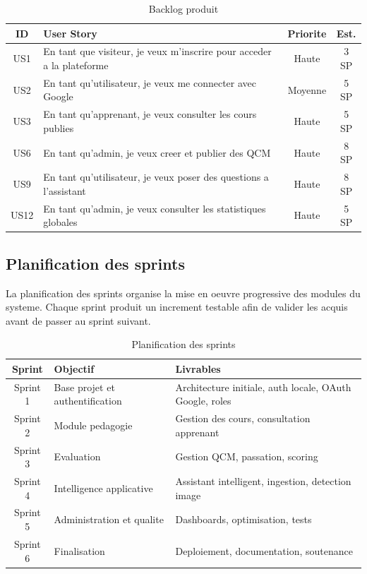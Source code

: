 \documentclass[a4paper,12pt]{report}
\begin{document}
\begin{table}[H]
  \centering
  \caption{Backlog produit}
  \label{tab:backlog}
  \begin{tabular}{|c|p{8.2cm}|c|c|}
    \hline
    \textbf{ID} & \textbf{User Story} & \textbf{Priorite} & \textbf{Est.} \\
    \hline
    US1  & En tant que visiteur, je veux m'inscrire pour acceder a la plateforme & Haute & 3 SP \\
    \hline
    US2  & En tant qu'utilisateur, je veux me connecter avec Google & Moyenne & 5 SP \\
    \hline
    US3  & En tant qu'apprenant, je veux consulter les cours publies & Haute & 5 SP \\
    \hline
    US6  & En tant qu'admin, je veux creer et publier des QCM & Haute & 8 SP \\
    \hline
    US9  & En tant qu'utilisateur, je veux poser des questions a l'assistant & Haute & 8 SP \\
    \hline
    US12 & En tant qu'admin, je veux consulter les statistiques globales & Haute & 5 SP \\
    \hline
  \end{tabular}
\end{table}

\subsection{Planification des sprints}

La planification des sprints organise la mise en oeuvre progressive des modules
du systeme. Chaque sprint produit un increment testable afin de valider les
acquis avant de passer au sprint suivant.

\begin{table}[H]
  \centering
  \caption{Planification des sprints}
  \label{tab:sprints}
  \begin{tabular}{|c|p{4.5cm}|p{7cm}|}
    \hline
    \textbf{Sprint} & \textbf{Objectif} & \textbf{Livrables} \\
    \hline
    Sprint 1 & Base projet et authentification & Architecture initiale, auth locale, OAuth Google, roles \\
    \hline
    Sprint 2 & Module pedagogie & Gestion des cours, consultation apprenant \\
    \hline
    Sprint 3 & Evaluation & Gestion QCM, passation, scoring \\
    \hline
    Sprint 4 & Intelligence applicative & Assistant intelligent, ingestion, detection image \\
    \hline
    Sprint 5 & Administration et qualite & Dashboards, optimisation, tests \\
    \hline
    Sprint 6 & Finalisation & Deploiement, documentation, soutenance \\
    \hline
  \end{tabular}
\end{table}
\end{document}
